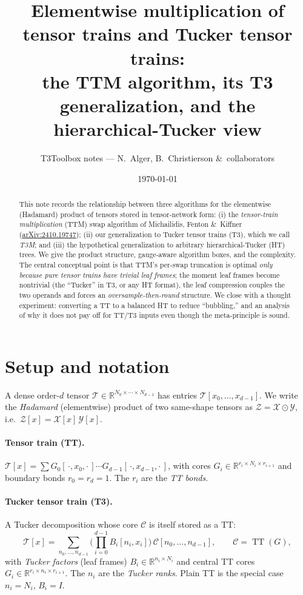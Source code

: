 \documentclass[11pt]{article}
\title{\bfseries Elementwise multiplication of tensor trains and Tucker tensor
trains:\\ the TTM algorithm, its T3 generalization, and the hierarchical-Tucker view}
\author{T3Toolbox notes --- N.\ Alger, B.\ Christierson \&\ collaborators}
\date{\today}
\newcommand{\T}{\mathcal{T}}
\newcommand{\X}{\mathcal{X}}
\newcommand{\Y}{\mathcal{Y}}
\newcommand{\Z}{\mathcal{Z}}
\newcommand{\C}{\mathcal{C}}                 %
\newcommand{\R}{\mathbb{R}}
\newcommand{\had}{\odot}                     %
\DeclareMathOperator{\TT}{TT}
\begin{document}
\maketitle

\begin{abstract}
This note records the relationship between three algorithms for the elementwise
(Hadamard) product of tensors stored in tensor-network form: (i) the
\emph{tensor-train multiplication} (TTM) swap algorithm of Michailidis,
Fenton \&\ Kiffner (\href{https://arxiv.org/abs/2410.19747}{arXiv:2410.19747});
(ii) our generalization to Tucker tensor trains (T3), which we call \emph{T3M};
and (iii) the hypothetical generalization to arbitrary hierarchical-Tucker (HT)
trees. We give the product structure, gauge-aware algorithm boxes, and the
complexity. The central conceptual point is that TTM's per-swap truncation is
optimal \emph{only because pure tensor trains have trivial leaf frames}; the
moment leaf frames become nontrivial (the ``Tucker'' in T3, or any HT format),
the leaf compression couples the two operands and forces an
\emph{oversample-then-round} structure. We close with a thought experiment:
converting a TT to a balanced HT to reduce ``bubbling,'' and an analysis of why
it does not pay off for TT/T3 inputs even though the meta-principle is sound.
\end{abstract}

\section{Setup and notation}

A dense order-$d$ tensor $\T\in\R^{N_0\times\cdots\times N_{d-1}}$ has entries
$\T[x_0,\dots,x_{d-1}]$. We write the \emph{Hadamard} (elementwise) product of two
same-shape tensors as $\Z=\X\had\Y$, i.e.\ $\Z[x]=\X[x]\,\Y[x]$.

\paragraph{Tensor train (TT).}
$\displaystyle \T[x]=\sum G_0[\,\cdot,x_0,\cdot\,]\cdots G_{d-1}[\,\cdot,x_{d-1},\cdot\,]$,
with cores $G_i\in\R^{r_i\times N_i\times r_{i+1}}$ and boundary bonds
$r_0=r_d=1$. The $r_i$ are the \emph{TT bonds}.

\paragraph{Tucker tensor train (T3).}
A Tucker decomposition whose core $\C$ is itself stored as a TT:
\begin{equation}
\T[x]=\sum_{n_0,\dots,n_{d-1}} \Big(\prod_{i=0}^{d-1} B_i[n_i,x_i]\Big)\,\C[n_0,\dots,n_{d-1}],
\qquad \C=\TT(G),
\label{eq:t3}
\end{equation}
with \emph{Tucker factors} (leaf frames) $B_i\in\R^{n_i\times N_i}$ and central TT
cores $G_i\in\R^{r_i\times n_i\times r_{i+1}}$. The $n_i$ are the \emph{Tucker ranks}.
Plain TT is the special case $n_i=N_i$, $B_i=I$.
\end{document}
